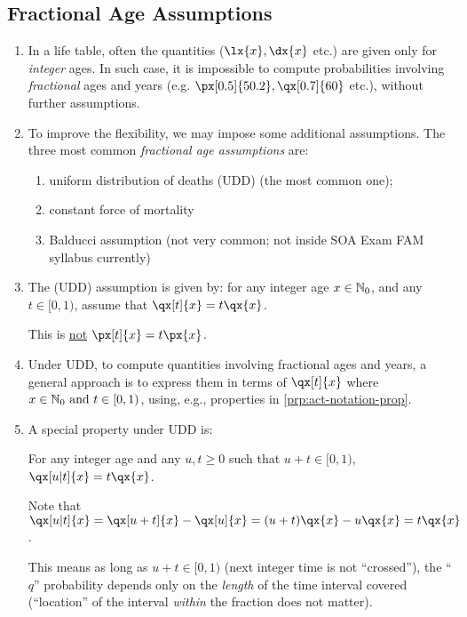 \subsection{Fractional Age Assumptions}
\begin{enumerate}
\item In a life table, often the quantities (\(\lx{x},\dx{x}\) etc.) are given
only for \emph{integer} ages. In such case, it is impossible to compute probabilities
involving \emph{fractional} ages and years (e.g. \(\px[0.5]{50.2},
\qx[0.7]{60}\) etc.), without further assumptions.
\item To improve the flexibility, we may impose some additional assumptions.
The three most common \emph{fractional age assumptions} are: \begin{enumerate}
\item uniform distribution of deaths (UDD) (the most common one);
\item constant force of mortality
\item Balducci assumption (not very common; not inside SOA Exam FAM
syllabus currently)
\end{enumerate}

\item The  (UDD) assumption is given by: for
any integer age \(x\in\mathbb{N}_0\), and any \(t\in[0,1)\), assume that
\(\qx[t]{x}=t\qx{x}\).
\begin{warning}
This is \underline{not} \(\px[t]{x}=t\px{x}\).
\end{warning}
\item \label{it:udd-approach} Under UDD, to compute quantities involving fractional ages and years,
a general approach is to express them in terms of \(\qx[t]{x}\) where
\(x\in\mathbb{N}_0\text{ and }t\in[0,1)\), using, e.g., properties in \cref{prp:act-notation-prop}.
\item A special property under UDD is:
\begin{proposition}
\label{prp:udd-only-length}
For any integer age and any \(u,t\ge 0\) such that \(u+t\in[0,1)\),
\(\qx[u|t]{x}=t\qx{x}\).
\end{proposition}

\begin{pf}
Note that \(\qx[u|t]{x}=\qx[u+t]{x}-\qx[u]{x}=(u+t)\qx{x}-u\qx{x}=t\qx{x}\).
\end{pf}

\begin{note}
This means as long as \(u+t\in[0,1)\) (next integer time is not ``crossed''),
the ``\(q\)'' probability depends only on the \emph{length} of the time interval
covered (``location'' of the interval \emph{within} the fraction does not
matter).
\end{note}


\end{enumerate}
